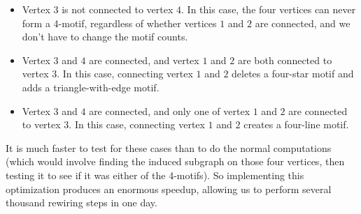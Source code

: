 \begin{itemize}
\item Vertex $3$ is not connected to vertex $4$.  In this case, the four vertices can never form a 4-motif, regardless of whether vertices $1$ and $2$ are connected, and we don't have to change the motif counts.
\item Vertex $3$ and $4$ are connected, and vertex $1$ and $2$ are both connected to vertex $3$.  In this case, connecting vertex $1$ and $2$ deletes a four-star motif and adds a triangle-with-edge motif.
\item Vertex $3$ and $4$ are connected, and only one of vertex $1$ and $2$ are connected to vertex $3$.  In this case, connecting vertex $1$ and $2$ creates a four-line motif.
\end{itemize}

It is much faster to test for these cases than to do the normal computations (which would involve finding the induced subgraph on those four vertices, then testing it to see if it was either of the 4-motifs).  So implementing this optimization produces an enormous speedup, allowing us to perform several thousand rewiring steps in one day.

